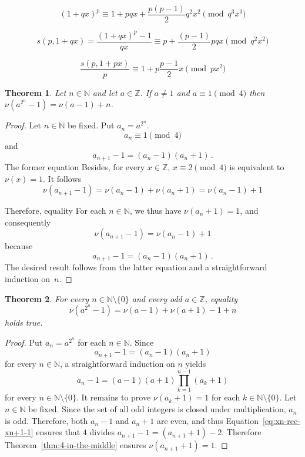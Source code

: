 \documentclass[12pt]{article}
\newcommand{\bZ}{\mathbb{Z}}
\newcommand{\bN}{\mathbb{N}} %
\newcommand{\bNast}{\bN \setminus \{ 0 \}}
\newtheorem{theorem}{Theorem}
\theoremstyle{definition}
\begin{document}
$$
{(1 + q x)}^p \equiv  1 + p q x + \frac{p(p - 1)}{2} q^2  x^2  \pmod{q^3 x^3}
$$

$$
s(p, 1 + q x) = \frac{{(1 + q x)}^p - 1}{q x} \equiv  p  +   \frac{(p - 1)}{2} p q  x \pmod {q^2 x^2}
$$


$$
\frac{s(p, 1 + p x)}{p}  \equiv  1 + p \frac{p - 1}{2} x   \pmod{p x^2}
$$
 
 
 
 \begin{theorem} \label{thm:nu-power-2}
   Let $n \in \bN$ and let $a \in \bZ$.
   If $a \ne 1$ and  $a \equiv 1 \pmod 4$ then $ \nu(a^{2^n} - 1) = \nu(a - 1)  + n$.
 \end{theorem}


 \begin{proof}
   Let $n \in \bN$ be fixed.
   Put $a_n = a^{2^n}$.
   $$
   a_n \equiv 1 \pmod 4
   $$
   and
   $$
   a_{n + 1} - 1 = (a_n - 1) (a_n + 1) \,. 
   $$
   The former equation 
   Besides,  for every  $x \in \bZ$, $x \equiv 2 \pmod 4$ is equivalent to  $\nu(x) = 1$.
   It follows 
   $$
   \nu(a_{n + 1} - 1) = \nu(a_n - 1) + \nu(a_n + 1) = \nu(a_n - 1) + 1
   $$
   

   Therefore, equality 
   For each $n \in \bN$,
   we thus have  $\nu(a_n + 1) = 1$, and consequently
   $$
   \nu(a_{n + 1} - 1) = \nu(a_n - 1) + 1 
   $$
   because
   $$
   a_{n + 1} - 1 = (a_n - 1) (a_n + 1) \,.
   $$
   The desired result follows from the latter equation and a straightforward induction on~$n$.
 \end{proof}

 
 \begin{theorem} \label{thm:nu-power-2}
   For every $n \in \bNast$ and every odd $a \in \bZ$,
   equality
   $$
   \nu(a^{2^n} - 1) = \nu(a - 1) + \nu(a + 1) - 1 + n 
   $$
   holds true.
 \end{theorem}


 \begin{proof}
   Put $a_n = a^{2^n}$ for each $n \in \bN$.
   Since 
   \begin{equation} \label{eq:xn-rec-xn+1-1}
   a_{n + 1} - 1 = (a_n - 1) (a_n + 1) 
   \end{equation}
   for every  $n \in \bN$,
   a straightforward induction on $n$ yields
   $$
   a_n - 1 = (a - 1)(a + 1) \prod_{k = 1}^{n - 1} (a_k + 1) 
   $$
   for every $n \in \bNast$.
   It remains to prove $\nu(a_k + 1) = 1$ for each $k \in \bNast$.
   Let $n \in \bN$ be fixed.
   Since the set of all odd integers is closed under multiplication,
   $a_n$ is odd.
   Therefore, both $a_n - 1$ and $a_n + 1$  are even,
   and thus Equation~\eqref{eq:xn-rec-xn+1-1} ensures that $4$ divides
   $a_{n + 1} - 1 = (a_{n + 1} + 1) - 2$.
   Therefore Theorem~\ref{thm:4-in-the-middle} ensures  $\nu(a_{n + 1} + 1) = 1$.
 \end{proof}
\end{document}
